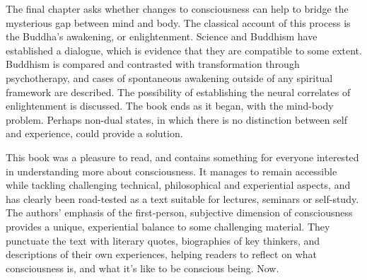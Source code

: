 \documentclass[a4paper]{article}
\begin{document}
The final chapter asks whether changes to consciousness can help to bridge the
mysterious gap between mind and body. The classical account of this process is
the Buddha’s awakening, or enlightenment. Science and Buddhism have
established a dialogue, which is evidence that they are compatible to some
extent. Buddhism is compared and contrasted with transformation through
psychotherapy, and cases of spontaneous awakening outside of any spiritual
framework are described. The possibility of establishing the neural correlates
of enlightenment is discussed. The book ends as it began, with the mind-body
problem. Perhaps non-dual states, in which there is no distinction between
self and experience, could provide a solution.

This book was a pleasure to read, and contains something for everyone
interested in understanding more about consciousness. It manages to remain
accessible while tackling challenging technical, philosophical and
experiential aspects, and has clearly been road-tested as a text suitable for
lectures, seminars or self-study. The authors' emphasis of the first-person,
subjective dimension of consciousness provides a unique, experiential balance
to some challenging material. They punctuate the text with literary quotes,
biographies of key thinkers, and descriptions of their own experiences,
helping readers to reflect on what consciousness is, and what it’s like to be
conscious being. Now.
\end{document}
